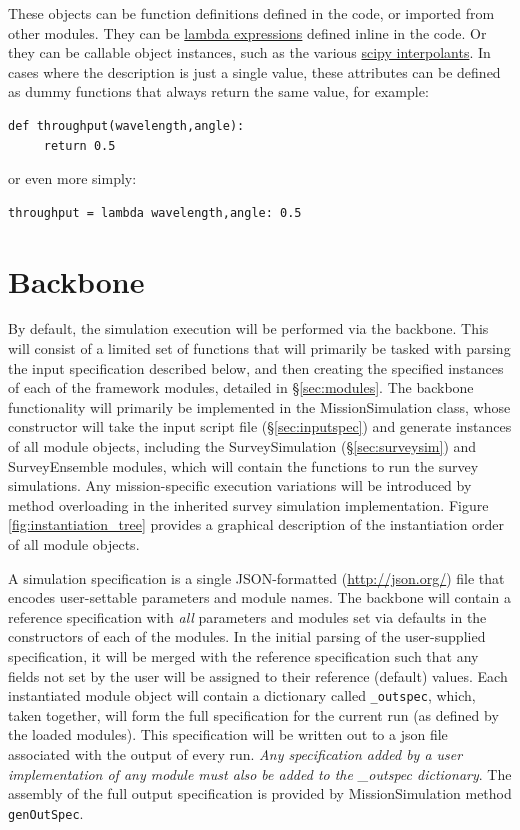 \documentclass[cleanfoot]{asme2ej}
\newcommand{\reffig}[1]{Figure \ref{#1}}
\begin{document}
These objects can be function definitions defined in the code, or imported from other modules.  They can be \href{https://docs.python.org/2/reference/expressions.html#lambda}{lambda expressions} defined inline in the code.  Or they can be callable object instances, such as the various \href{http://docs.scipy.org/doc/scipy/reference/interpolate.html}{scipy interpolants}.  In cases where the description is just a single value, these attributes can be defined as dummy functions that always return the same value, for example:
\begin{verbatim}
def throughput(wavelength,angle):
     return 0.5
\end{verbatim}
or even more simply:
\begin{verbatim}
throughput = lambda wavelength,angle: 0.5
\end{verbatim}

\section{Backbone}
By default, the simulation execution will be performed via the backbone.  This will consist of a limited set of functions that will primarily be tasked with parsing the input specification described below, and then creating the specified instances of each of the framework modules, detailed in \S\ref{sec:modules}.  The backbone functionality will primarily be implemented in the MissionSimulation class, whose constructor will take the input script file (\S\ref{sec:inputspec}) and generate instances of all module objects, including the SurveySimulation (\S\ref{sec:surveysim}) and SurveyEnsemble modules, which will contain the functions to run the survey simulations. Any mission-specific execution variations will be introduced by method overloading in the inherited survey simulation implementation. \reffig{fig:instantiation_tree} provides a graphical description of the instantiation order of all module objects.


A simulation specification is a single JSON-formatted (\url{http://json.org/}) file that encodes user-settable parameters and module names.  The backbone will contain a reference specification with \emph{all} parameters and modules set via defaults in the constructors of each of the modules.  In the initial parsing of the user-supplied specification, it will be merged with the reference specification such that any fields not set by the user will be assigned to their reference (default) values.   Each instantiated module object will contain a dictionary called \verb+_outspec+, which, taken together, will form the full specification for the current run (as defined by the loaded modules).  This specification will be written out to a json file associated with the output of every run.  \emph{Any specification added by a user implementation of any module must also be added to the \_outspec dictionary}.  The assembly of the full output specification is provided by MissionSimulation method \verb+genOutSpec+.
\end{document}
